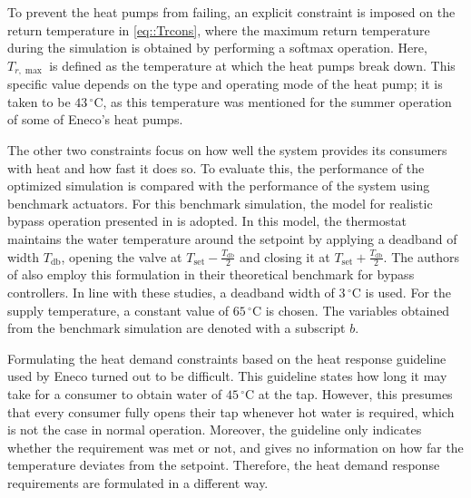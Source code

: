 

To prevent the heat pumps from failing, an explicit constraint is imposed on the return temperature in \eqref{eq::Trcons}, where the maximum return temperature during the simulation is obtained by performing a softmax operation. Here, $T_{r,\max}$ is defined as the temperature at which the heat pumps break down. This specific value depends on the type and operating mode of the heat pump; it is taken to be $43\,^{\circ}$C, as this temperature was mentioned for the summer operation of some of Eneco's heat pumps.

The other two constraints focus on how well the system provides its consumers with heat and how fast it does so. To evaluate this, the performance of the optimized simulation is compared with the performance of the system using benchmark actuators. For this benchmark simulation, the model for realistic bypass operation presented in \cite{BRAND2014256} is adopted. In this model, the thermostat maintains the water temperature around the setpoint by applying a deadband of width $T_{\text{db}}$, opening the valve at $T_{\text{set}} - \frac{T_{\text{db}}}{2}$ and closing it at $T_{\text{set}} + \frac{T_{\text{db}}}{2}$. The authors of \cite{theoreticalbenchmark} also employ this formulation in their theoretical benchmark for bypass controllers. In line with these studies, a deadband width of $3\,^{\circ}$C is used. For the supply temperature, a constant value of $65\,^{\circ}$C is chosen. The variables obtained from the benchmark simulation are denoted with a subscript $b$.

Formulating the heat demand constraints based on the heat response guideline used by Eneco turned out to be difficult. This guideline states how long it may take for a consumer to obtain water of $45\,^{\circ}$C at the tap. However, this presumes that every consumer fully opens their tap whenever hot water is required, which is not the case in normal operation. Moreover, the guideline only indicates whether the requirement was met or not, and gives no information on how far the temperature deviates from the setpoint. Therefore, the heat demand response requirements are formulated in a different way.

